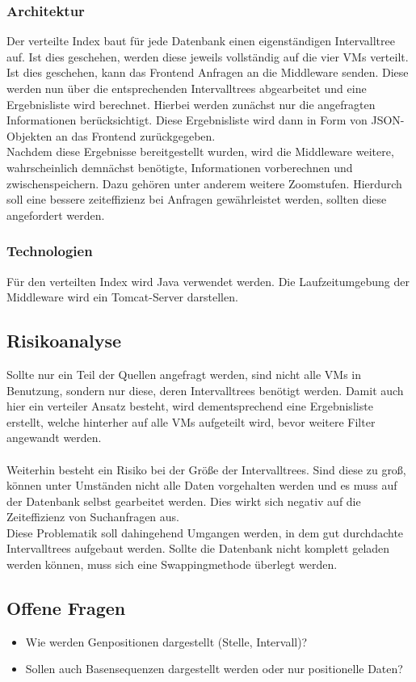 \documentclass{scrartcl}
\begin{document}
\subsubsection{Architektur}
Der verteilte Index baut für jede Datenbank einen eigenständigen Intervalltree auf. Ist dies geschehen, werden diese jeweils vollständig auf die vier VMs verteilt.\\
Ist dies geschehen, kann das Frontend Anfragen an die Middleware senden. Diese werden nun über die entsprechenden Intervalltrees abgearbeitet und eine Ergebnisliste wird berechnet. Hierbei werden zunächst nur die angefragten Informationen berücksichtigt. Diese Ergebnisliste wird dann in Form von JSON-Objekten an das Frontend zurückgegeben. \\
Nachdem diese Ergebnisse bereitgestellt wurden, wird die Middleware weitere, wahrscheinlich demnächst benötigte, Informationen vorberechnen und zwischenspeichern. Dazu gehören unter anderem weitere Zoomstufen. Hierdurch soll eine bessere zeiteffizienz bei Anfragen gewährleistet werden, sollten diese angefordert werden.
\subsubsection{Technologien}
Für den verteilten Index wird Java verwendet werden. Die Laufzeitumgebung der Middleware wird ein Tomcat-Server darstellen.
\subsection{Risikoanalyse}
Sollte nur ein Teil der Quellen angefragt werden, sind nicht alle VMs in Benutzung, sondern nur diese, deren Intervalltrees benötigt werden. Damit auch hier ein verteiler Ansatz besteht, wird dementsprechend eine Ergebnisliste erstellt, welche hinterher auf alle VMs aufgeteilt wird, bevor weitere Filter angewandt werden.\\\\
Weiterhin besteht ein Risiko bei der Größe der Intervalltrees. Sind diese zu groß, können unter Umständen nicht alle Daten vorgehalten werden und es muss auf der Datenbank selbst gearbeitet werden. Dies wirkt sich negativ auf die Zeiteffizienz von Suchanfragen aus.\\
Diese Problematik soll dahingehend Umgangen werden, in dem gut durchdachte Intervalltrees aufgebaut werden. Sollte die Datenbank nicht komplett geladen werden können, muss sich eine Swappingmethode überlegt werden.
\subsection{Offene Fragen}
\begin{itemize}
\item Wie werden Genpositionen dargestellt (Stelle, Intervall)?
\item Sollen auch Basensequenzen dargestellt werden oder nur positionelle Daten?
\end{itemize}
\end{document}
